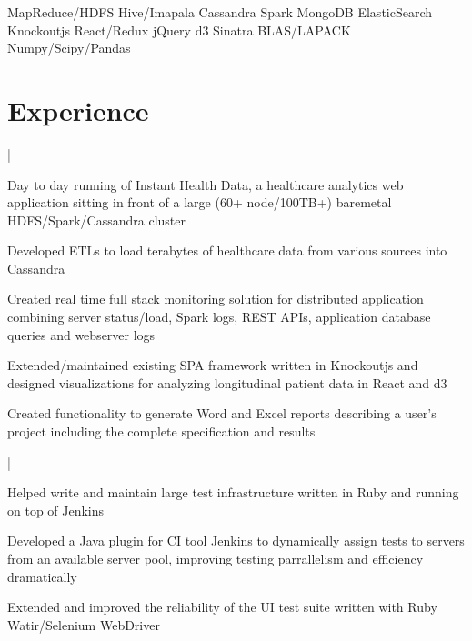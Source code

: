 \documentclass[]{deedy-resume-openfont}
\begin{document}
 \descript{}
\vspace{1pt}
MapReduce/HDFS \textbullet{} Hive/Imapala \textbullet{} Cassandra \textbullet{} Spark \textbullet{} MongoDB \textbullet{} ElasticSearch \\
Knockoutjs \textbullet{} React/Redux \textbullet{} jQuery \textbullet{} d3 \textbullet{} Sinatra \textbullet{} BLAS/LAPACK \textbullet{} Numpy/Scipy/Pandas
\sectionsep


\section{Experience}

|
\begin{tightemize}
\item Day to day running of Instant Health Data, a healthcare analytics web application sitting in front of a large (60+ node/100TB+) baremetal HDFS/Spark/Cassandra cluster
\item Developed ETLs to load terabytes of healthcare data from various sources into Cassandra
\item Created real time full stack monitoring solution for distributed application combining server status/load, Spark logs, REST APIs, application database queries and webserver logs
\item Extended/maintained existing SPA framework written in Knockoutjs and designed visualizations for analyzing longitudinal patient data in React and d3
\item Created functionality to generate Word and Excel reports describing a user's project including the complete specification and results
\end{tightemize}
\sectionsep

|
\begin{tightemize}
\item Helped write and maintain large test infrastructure written in Ruby and running on top of Jenkins
\item Developed a Java plugin for CI tool Jenkins to dynamically assign tests to servers from an available server pool, improving testing parrallelism and efficiency dramatically
\item Extended and improved the reliability of the UI test suite written with Ruby Watir/Selenium WebDriver
\end{tightemize}
\sectionsep
\end{document}
